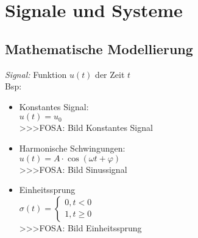 



\chapter{Signale und Systeme}

\section{Mathematische Modellierung}
\emph{Signal: }Funktion $u(t)$ der Zeit $t$\\
Bsp: 
\begin{itemize}
  \item Konstantes Signal: \\
        $u(t) = u_0$ \\
        >>>FOSA: Bild Konstantes Signal
  \item Harmonische Schwingungen: \\
        $u(t) = A \cdot \cos(\omega t + \varphi)$ \\
        >>>FOSA: Bild Sinussignal
  \item Einheitssprung \\
        $\sigma(t) = 
        \left\lbrace 
        \begin{array}{l}
        0, t<0 \\
        1, t \geq 0
        \end{array} 
        \right. $\\
        >>>FOSA: Bild Einheitssprung
\end{itemize}

